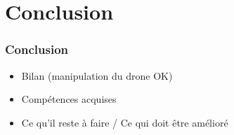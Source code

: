 \section{Conclusion}
\begin{frame}
\frametitle{Conclusion}
\begin{center}
\begin{itemize}
\item Bilan (manipulation du drone OK)
\item Compétences acquises
\item Ce qu'il reste à faire / Ce qui doit être amélioré
\end{itemize}
\end{center}
\end{frame}